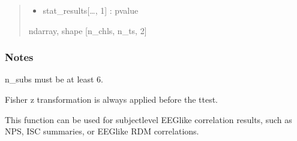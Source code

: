 \documentclass[letterpaper,10pt,english]{sphinxhowto}
\begin{document}
\begin{fulllineitems}
\begin{quote}
\begin{description}
\begin{itemize}
\item {} 
\sphinxAtStartPar
stat\_results{[}…, 1{]} : p\sphinxhyphen{}value

\end{itemize}


\sphinxAtStartPar
ndarray, shape {[}n\_chls, n\_ts, 2{]}

\end{description}\end{quote}
\subsubsection*{Notes}

\sphinxAtStartPar
n\_subs must be at least 6.

\sphinxAtStartPar
Fisher z transformation is always applied before the t\sphinxhyphen{}test.

\sphinxAtStartPar
This function can be used for subject\sphinxhyphen{}level EEG\sphinxhyphen{}like correlation results,
such as NPS, ISC summaries, or EEG\sphinxhyphen{}like RDM correlations.

\end{fulllineitems}

\end{document}
